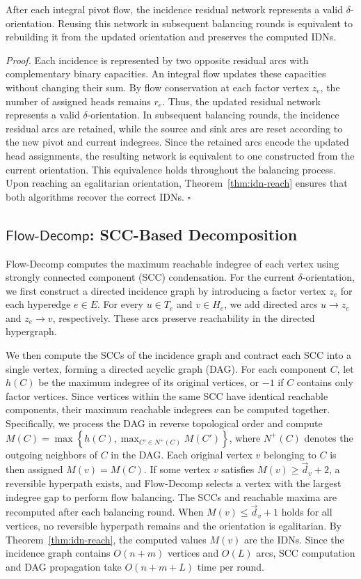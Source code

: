\documentclass[twocolumn]{svjour3}
\newcommand{\kw}[1]{{\ensuremath{\mathsf{#1}}}\xspace}
\begin{document}
\begin{theorem}\label{thm:reuse-flow}
After each integral pivot flow, the incidence residual network represents a valid $\delta$-orientation. Reusing this network in subsequent balancing rounds is equivalent to rebuilding it from the updated orientation and preserves the computed IDNs.
\end{theorem}

\emph{Proof.}
Each incidence is represented by two opposite residual arcs with complementary binary capacities. An integral flow updates these capacities without changing their sum. By flow conservation at each factor vertex $z_e$, the number of assigned heads remains $r_e$. Thus, the updated residual network represents a valid $\delta$-orientation.
In subsequent balancing rounds, the incidence residual arcs are retained, while the source and sink arcs are reset according to the new pivot and current indegrees. Since the retained arcs encode the updated head assignments, the resulting network is equivalent to one constructed from the current orientation. This equivalence holds throughout the balancing process. Upon reaching an egalitarian orientation, Theorem~\ref{thm:idn-reach} ensures that both algorithms recover the correct IDNs.
\hfill$\square$

\subsection{\kw{Flow\text{-}Decomp}: SCC-Based Decomposition}
\label{subsec:scc-all}
Flow-Decomp computes the maximum reachable indegree of each vertex using strongly connected component (SCC) condensation. For the current $\delta$-orientation, we first construct a directed incidence graph by introducing a factor vertex $z_e$ for each hyperedge $e\in E$. For every $u\in T_e$ and $v\in H_e$, we add directed arcs $u\to z_e$ and $z_e\to v$, respectively. These arcs preserve reachability in the directed hypergraph.

We then compute the SCCs of the incidence graph and contract each SCC into a single vertex, forming a directed acyclic graph (DAG). For each component $C$, let $h(C)$ be the maximum indegree of its original vertices, or $-1$ if $C$ contains only factor vertices. Since vertices within the same SCC have identical reachable components, their maximum reachable indegrees can be computed together. Specifically, we process the DAG in reverse topological order and compute
$M(C)=\max\left\{h(C),\max_{C'\in N^+(C)}M(C')\right\}$,
where $N^+(C)$ denotes the outgoing neighbors of $C$ in the DAG. Each original vertex $v$ belonging to $C$ is then assigned $M(v)=M(C)$.
If some vertex $v$ satisfies $M(v)\ge\vec d_v+2$, a reversible hyperpath exists, and Flow-Decomp selects a vertex with the largest indegree gap to perform flow balancing. The SCCs and reachable maxima are recomputed after each balancing round. When $M(v)\le\vec d_v+1$ holds for all vertices, no reversible hyperpath remains and the orientation is egalitarian. By Theorem~\ref{thm:idn-reach}, the computed values $M(v)$ are the IDNs. Since the incidence graph contains $O(n+m)$ vertices and $O(L)$ arcs, SCC computation and DAG propagation take $O(n+m+L)$ time per round.
\end{document}

